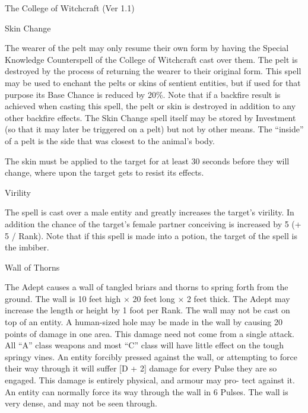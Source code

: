 \begin{Chapter}{The College of Witchcraft (Ver 1.1)}
\begin{spell}[S-17]{Skin Change}
\begin{effects}
The wearer of the pelt may only resume their own form by having the
Special Knowledge Counterspell of the College of Witchcraft cast over
them.  The pelt is destroyed by the process of returning the wearer to
their original form. This spell may be used to enchant the pelts or
skins of sentient entities, but if used for that purpose its Base
Chance is reduced by 20\%.  Note that if a backfire result is achieved
when casting this spell, the pelt or skin is destroyed in addition to
any other backfire effects.  The Skin Change spell itself may be
stored by Investment (so that it may later be triggered on a pelt) but
not by other means. The “inside” of a pelt is the side that was
closest to the animal’s body.

The skin must be applied to the target for at least 30 seconds before
they will change, where upon the target gets to resist its effects.
\end{effects}
\end{spell}

\begin{spell}[S-18]{Virility}

\begin{effects}
The spell is cast over a male entity and greatly increases the
target’s virility.  In addition the chance of the target’s female
partner conceiving is increased by 5 (+ 5 / Rank). Note that if this
spell is made into a potion, the target of the spell is the imbiber.
\end{effects}
\end{spell}

\begin{spell}[S-19]{Wall of Thorns}

\begin{effects}
The Adept causes a wall of tangled briars and thorns to spring forth
from the ground.  The wall is 10 feet high × 20 feet long × 2 feet
thick.  The Adept may increase the length or height by 1 foot per
Rank. The wall may not be cast on top of an entity. A human-sized hole
may be made in the wall by causing 20 points of damage in one area.
This damage need not come from a single attack.  All “A” class weapons
and most “C” class will have little effect on the tough springy vines.
An entity forcibly pressed against the wall, or attempting to force
their way through it will suffer [D + 2] damage for every Pulse they
are so engaged.  This damage is entirely physical, and armour may pro-
tect against it. An entity can normally force its way through the wall
in 6 Pulses.  The wall is very dense, and may not be seen through.
\end{effects}
\end{spell}



\end{Chapter}
